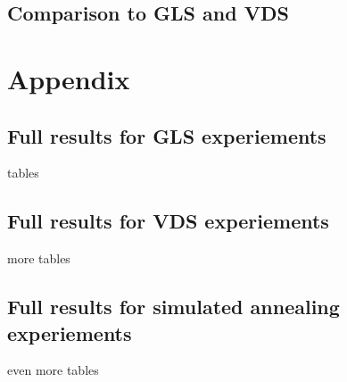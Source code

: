 \documentclass[12pt,a4paper,reqno]{article}
\begin{document}
\subsection{Comparison to GLS and VDS}


\newpage
{}


\newpage

\section{Appendix}
\subsection*{Full results for GLS experiements}
tables

\subsection*{Full results for VDS experiements}
more tables

\subsection*{Full results for simulated annealing experiements}
even more tables
\end{document}
